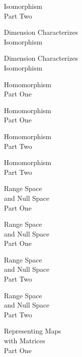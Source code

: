 \documentclass{titlescreen}
\begin{document}
% 
\begin{videotitle}
  Isomorphism  \\[1ex]
  Part Two
\end{videotitle}
\begin{videoend}
  Dimension Characterizes \\[0.5ex]
  Isomorphism
\end{videoend}

\begin{videotitle}
  Dimension Characterizes \\[0.5ex]
  Isomorphism
\end{videotitle}
\begin{videoend}
  Homomorphism  \\[1ex]
  Part One
\end{videoend}

\begin{videotitle}
  Homomorphism  \\[1ex]
  Part One
\end{videotitle}
\begin{videoend}
  Homomorphism  \\[1ex]
  Part Two
\end{videoend}

%
\begin{videotitle}
  Homomorphism  \\[1ex]
  Part Two
\end{videotitle}
\begin{videoend}
  Range Space  \\[0.5ex]
  and Null Space  \\[1ex]
  Part One
\end{videoend}

\begin{videotitle}
  Range Space  \\[0.5ex]
  and Null Space  \\[1ex]
  Part One
\end{videotitle}
\begin{videoend}
  Range Space  \\[0.5ex]
  and Null Space  \\[1ex]
  Part Two
\end{videoend}

%
\begin{videotitle}
  Range Space  \\[0.5ex]
  and Null Space  \\[1ex]
  Part Two
\end{videotitle}
\begin{videoend}
  Representing Maps  \\[0.5ex]
  with Matrices  \\[1ex]
  Part One
\end{videoend}
\end{document}
